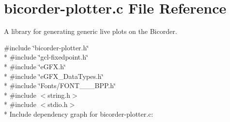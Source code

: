 \hypertarget{bicorder-plotter_8c}{}\section{bicorder-\/plotter.c File Reference}
\label{bicorder-plotter_8c}


A library for generating generic live plots on the Bicorder.  


{\ttfamily \#include \char`\"{}bicorder-\/plotter.\+h\char`\"{}}\\*
{\ttfamily \#include \char`\"{}gcl-\/fixedpoint.\+h\char`\"{}}\\*
{\ttfamily \#include \char`\"{}e\+G\+F\+X.\+h\char`\"{}}\\*
{\ttfamily \#include \char`\"{}e\+G\+F\+X\+\_\+\+Data\+Types.\+h\char`\"{}}\\*
{\ttfamily \#include \char`\"{}Fonts/\+F\+O\+N\+T\+\_\+\_\+\_\+B\+P\+P.\+h\char`\"{}}\\*
{\ttfamily \#include $<$string.\+h$>$}\\*
{\ttfamily \#include $<$stdio.\+h$>$}\\*
Include dependency graph for bicorder-\/plotter.c\+:
